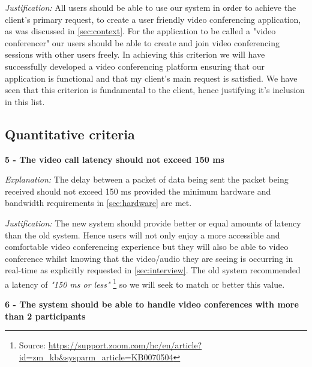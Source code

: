 \vspace{0.1cm}

\textit{Justification:}
All users should be able to use our system in order to 
achieve the client's primary request, to create a user
friendly video conferencing application, as was discussed
in \ref{sec:context}. For the application to be called a 
"video conferencer" our users should be able to create and
join video conferencing sessions with other users freely.
In achieving this criterion we will have successfully 
developed a video conferencing platform ensuring that our 
application is functional and that my client's main request
is satisfied. We have seen that this criterion is fundamental
to the client, hence justifying it's inclusion in this list.\\

\subsection{Quantitative criteria}

\textsf{\bfseries 5 - The video call latency should not exceed 150 ms}

\vspace{0.1cm}

\textit{Explanation:}
The delay between a packet of data being sent the packet 
being received should not exceed 150 ms provided the minimum
hardware and bandwidth requirements in \ref{sec:hardware} 
are met.

\vspace{0.1cm}

\textit{Justification:}
The new system should provide better or equal amounts of 
latency than the old system. Hence users will not only enjoy
a more accessible and comfortable video conferencing 
experience but they will also be able to video conference 
whilst knowing that the video/audio they are seeing is
occurring in real-time as explicitly requested in 
\ref{sec:interview}. The old system recommended a latency of
\textit{"150 ms or less"} \footnote{Source:
\url{https://support.zoom.com/hc/en/article?id=zm_kb&sysparm_article=KB0070504}} 
so we will seek to match or better this value.

\vspace{0.2cm}

\textsf{\bfseries 6 - The system should be able to handle video 
conferences with more than 2 participants}

\vspace{0.1cm}

